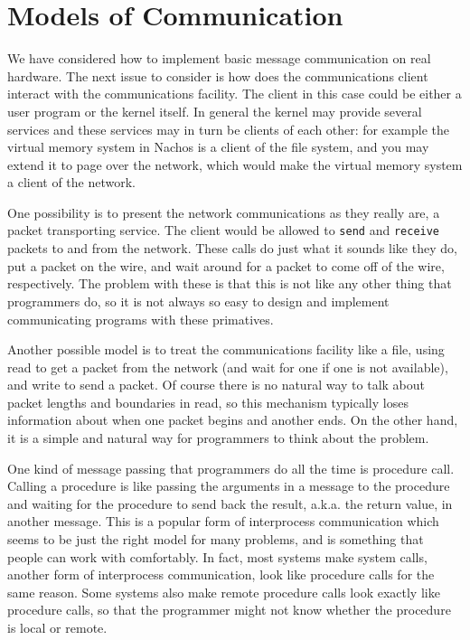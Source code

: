 \section{Models of Communication}

We have considered how to implement basic message communication on real
hardware.  The next issue to consider is how does the
communications client interact with the communications facility.
The client in this case could be either a user program or the kernel
itself.  In general the kernel may provide several services and these
services may in turn be clients of each other: for example the virtual
memory system in Nachos is a client of the file system, and you may
extend it to page over the network, which would make the virtual memory
system a client of the network.

One possibility is to present the network communications as they
really are, a packet transporting service.  The client would be allowed
to {\tt send} and {\tt receive} packets to and from the network.
These calls do just what it sounds like they do, put
a packet on the wire, and wait around for a packet to come off
of the wire, respectively.
The problem with these is that this is not like any other thing that
programmers do, so it is not always so easy to design and implement
communicating programs with these primatives.

Another possible model is to treat the communications
facility like a file, using read to get a packet from the network (and
wait for one if one is not available), and write to send a packet.  Of course
there is no natural way to talk about packet lengths and boundaries in read,
so this mechanism typically loses information about when one packet begins
and another ends.  On the other hand, it is a simple and natural way for
programmers to think about the problem.

One kind of message passing that programmers do all the time is procedure
call.  Calling a procedure is like passing the arguments in a message to
the procedure and waiting for the procedure to send back the result,
a.k.a. the return value, 
in another message.  This is a popular form of interprocess
communication which seems to be just the right model for many problems, and
is something that people can work with comfortably.  In fact, most systems
make system calls, another form of interprocess communication, look like
procedure calls for the same reason.  Some systems also make remote procedure
calls look exactly like procedure calls, so that the programmer might not
know whether the procedure is local or remote.

